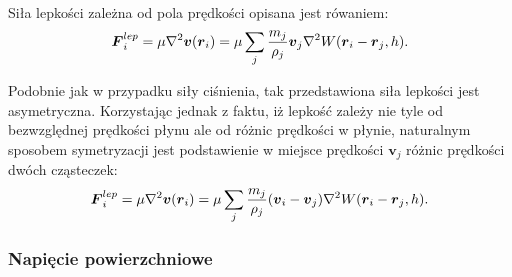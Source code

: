 \paragraph{}
Siła lepkości zależna od pola prędkości opisana jest rówaniem:
\begin{equation}
\boldsymbol{F}_i^{lep} = \mu \nabla^2 \boldsymbol{v}(\boldsymbol{r}_i) = \mu \sum\limits_{j} {m_j \over \rho_j} \boldsymbol{v}_j \nabla^2 W(\boldsymbol{r}_i-\boldsymbol{r}_j, h).
\label{eqn:sph_force_viscosity_1}
\end{equation}

Podobnie jak w przypadku siły ciśnienia, tak przedstawiona siła lepkości jest asymetryczna. Korzystając jednak z faktu, iż lepkość zależy nie tyle od bezwzględnej prędkości płynu ale od różnic prędkości w płynie, naturalnym sposobem symetryzacji jest podstawienie w miejsce prędkości $\boldsymbol{v}_j$ różnic prędkości dwóch cząsteczek:
\begin{equation}
\boldsymbol{F}_i^{lep} = \mu \nabla^2 \boldsymbol{v}(\boldsymbol{r}_i) = \mu \sum\limits_{j} {m_j \over \rho_j} (\boldsymbol{v}_i - \boldsymbol{v}_j) \nabla^2 W(\boldsymbol{r}_i-\boldsymbol{r}_j, h).
\label{eqn:sph_force_viscosity}
\end{equation}
\par

\subsubsection{Napięcie powierzchniowe}
\label{subsubsec:surface_tension}

